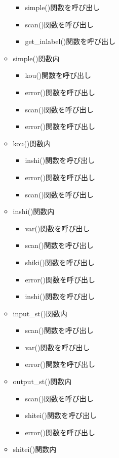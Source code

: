 \documentclass{jarticle}
\begin{document}
\begin{itemize}
\begin{itemize}
    \begin{itemize}
      \item simple()関数を呼び出し
      \item scan()関数を呼び出し
      \item get\_inlabel()関数を呼び出し
    \end{itemize}
    \item simple()関数内
    \begin{itemize}
      \item kou()関数を呼び出し
      \item error()関数を呼び出し
      \item scan()関数を呼び出し
      \item error()関数を呼び出し
    \end{itemize}
    \item kou()関数内
    \begin{itemize}
      \item inshi()関数を呼び出し
      \item error()関数を呼び出し
      \item scan()関数を呼び出し
    \end{itemize}
    \item inshi()関数内
    \begin{itemize}
      \item var()関数を呼び出し
      \item scan()関数を呼び出し
      \item shiki()関数を呼び出し
      \item error()関数を呼び出し
      \item inshi()関数を呼び出し
    \end{itemize}
    \item input\_st()関数内
    \begin{itemize}
      \item scan()関数を呼び出し
      \item var()関数を呼び出し
      \item error()関数を呼び出し
    \end{itemize}
    \item output\_st()関数内
    \begin{itemize}
      \item scan()関数を呼び出し
      \item shitei()関数を呼び出し
      \item error()関数を呼び出し
    \end{itemize}
    \item shitei()関数内

\end{itemize}
\end{itemize}
\end{document}
